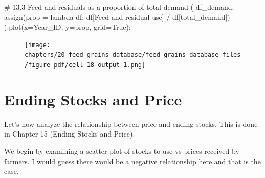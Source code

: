\documentclass[
  letterpaper,
  DIV=11,
  numbers=noendperiod]{scrreprt}
\newenvironment{Shaded}{\begin{snugshade}}{\end{snugshade}}
\newcommand{\CommentTok}[1]{\textcolor[rgb]{0.37,0.37,0.37}{#1}}
\newcommand{\KeywordTok}[1]{\textcolor[rgb]{0.00,0.23,0.31}{#1}}
\newcommand{\NormalTok}[1]{\textcolor[rgb]{0.00,0.23,0.31}{#1}}
\newcommand{\OperatorTok}[1]{\textcolor[rgb]{0.37,0.37,0.37}{#1}}
\newcommand{\StringTok}[1]{\textcolor[rgb]{0.13,0.47,0.30}{#1}}
\newcommand{\VariableTok}[1]{\textcolor[rgb]{0.07,0.07,0.07}{#1}}
\begin{document}
\begin{Shaded}
\begin{Highlighting}[]
\CommentTok{\# 13.3 Feed and residuals as a proportion of total demand}
\NormalTok{(}
\NormalTok{df\_demand.}
\NormalTok{    assign(prop }\OperatorTok{=} \KeywordTok{lambda}\NormalTok{ df: df[}\StringTok{\textquotesingle{}Feed and residual use\textquotesingle{}}\NormalTok{] }\OperatorTok{/}\NormalTok{ df[}\StringTok{\textquotesingle{}total\_demand\textquotesingle{}}\NormalTok{])}
\NormalTok{).plot(x}\OperatorTok{=}\StringTok{\textquotesingle{}Year\_ID\textquotesingle{}}\NormalTok{, y}\OperatorTok{=}\StringTok{\textquotesingle{}prop\textquotesingle{}}\NormalTok{, grid}\OperatorTok{=}\VariableTok{True}\NormalTok{)}\OperatorTok{;}
\end{Highlighting}
\end{Shaded}

\begin{figure}[H]

{\centering \texttt{[image: chapters/20\_feed\_grains\_database/feed\_grains\_database\_files/figure-pdf/cell-18-output-1.png]}

}

\end{figure}

\hypertarget{ending-stocks-and-price}{%
\section{Ending Stocks and Price}\label{ending-stocks-and-price}}

Let's now analyze the relationship between price and ending stocks. This
is done in Chapter 15 (Ending Stocks and Price).

We begin by examining a scatter plot of stocks-to-use vs prices received
by farmers. I would guess there would be a negative relationship here
and that is the case.
\end{document}
